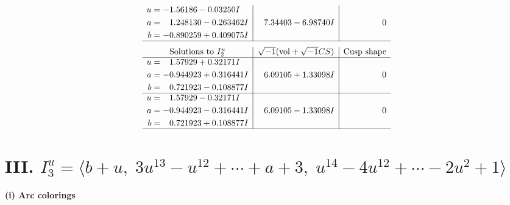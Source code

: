 \documentclass[1p]{elsarticle_modified}
\theoremstyle{definition}
\newcommand{\I}{\sqrt{-1}}
\begin{document}
$$\begin{array}{c|c|c}
\begin{aligned}
u &= -1.56186 - 0.03250 I \\
a &= \phantom{-}1.248130 - 0.263462 I \\
b &= -0.890259 + 0.409075 I\end{aligned}
 & \phantom{-}7.34403 - 6.98740 I & \phantom{-0.000000 } 0\\
 \hline 
 \end{array}$$\newpage$$\begin{array}{c|c|c}  
\text{Solutions to }I^u_{2}& \I (\text{vol} + \sqrt{-1}CS) & \text{Cusp shape}\\
 \hline 
\begin{aligned}
u &= \phantom{-}1.57929 + 0.32171 I \\
a &= -0.944923 + 0.316441 I \\
b &= \phantom{-}0.721923 - 0.108877 I\end{aligned}
 & \phantom{-}6.09105 + 1.33098 I & \phantom{-0.000000 } 0 \\ \hline\begin{aligned}
u &= \phantom{-}1.57929 - 0.32171 I \\
a &= -0.944923 - 0.316441 I \\
b &= \phantom{-}0.721923 + 0.108877 I\end{aligned}
 & \phantom{-}6.09105 - 1.33098 I & \phantom{-0.000000 } 0\\
 \hline 
 \end{array}$$\newpage\newpage\renewcommand{\arraystretch}{1}
\centering \section*{III. $I^u_{3}= \langle b+u,\;3 u^{13}- u^{12}+\cdots+a+3,\;u^{14}-4 u^{12}+\cdots-2 u^2+1 \rangle$}
\flushleft \textbf{(i) Arc colorings}\\
\end{document}
